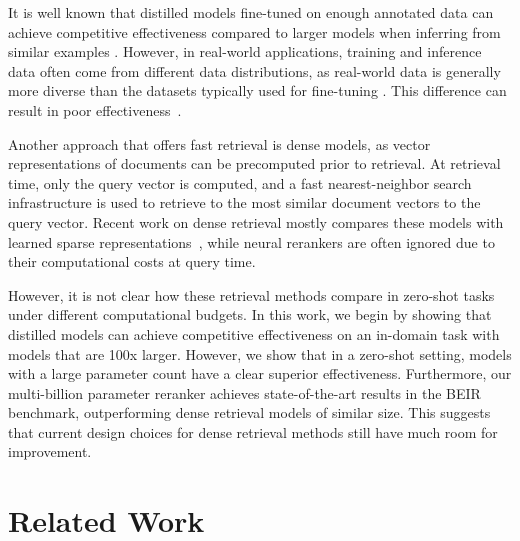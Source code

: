 \documentclass[sigconf,nonacm]{acmart}
\begin{document}
It is well known that distilled models fine-tuned on enough annotated data can achieve competitive effectiveness compared to larger models when inferring from similar examples \cite{distilbert,tinybert}. However, in real-world applications, training and inference data often come from different data distributions, as real-world data is generally more diverse than the datasets typically used for fine-tuning \cite{domain2}. This difference can result in poor effectiveness~\cite{domain_adaptation,domain_adaptation2}.

Another approach that offers fast retrieval is dense models, as vector representations of documents can be precomputed prior to retrieval. At retrieval time, only the query vector is computed, and a fast nearest-neighbor search infrastructure is used to retrieve to the most similar document vectors to the query vector. Recent work on dense retrieval mostly compares these models with learned sparse representations~\cite{wang2021gpl,xin2021zero,hofstatter2021efficiently,santhanam2021colbertv2,lu-etal-2021-less,hofstatter2022introducing,thakur2022domain}, while neural rerankers are often ignored due to their computational costs at query time.

However, it is not clear how these retrieval methods compare in zero-shot tasks under different computational budgets.
In this work, we begin by showing that distilled models can achieve competitive effectiveness on an in-domain task with models that are 100x larger. However, we show that in a zero-shot setting, models with a large parameter count have a clear superior effectiveness. Furthermore, our multi-billion parameter reranker achieves state-of-the-art results in the BEIR benchmark, outperforming dense retrieval models of similar size. This suggests that current design choices for dense retrieval methods still have much room for improvement.


\section{Related Work}
\end{document}
